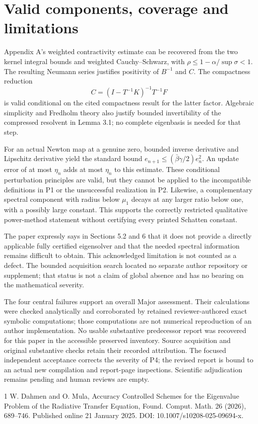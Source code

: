 \documentclass[10pt]{article}
\begin{document}
\section*{Valid components, coverage and limitations}
Appendix A’s weighted contractivity estimate can be recovered from the two kernel integral bounds and weighted Cauchy–Schwarz, with \(\rho\le1-\alpha/\sup\sigma<1\). The resulting Neumann series justifies positivity of \(B^{-1}\) and \(C\). The compactness reduction \[C=(I-T^{-1}K)^{-1}T^{-1}F\] is valid conditional on the cited compactness result for the latter factor. Algebraic simplicity and Fredholm theory also justify bounded invertibility of the compressed resolvent in Lemma 3.1; no complete eigenbasis is needed for that step.\par
For an actual Newton map at a genuine zero, bounded inverse derivative and Lipschitz derivative yield the standard bound \(e_{n+1}\le(\bar\beta\gamma/2)e_n^2\). An update error of at most \(\eta_n\) adds at most \(\eta_n\) to this estimate. These conditional perturbation principles are valid, but they cannot be applied to the incompatible definitions in P1 or the unsuccessful realization in P2. Likewise, a complementary spectral component with radius below \(\mu_1\) decays at any larger ratio below one, with a possibly large constant. This supports the correctly restricted qualitative power-method statement without certifying every printed Schatten constant.\par
The paper expressly says in Sections 5.2 and 6 that it does not provide a directly applicable fully certified eigensolver and that the needed spectral information remains difficult to obtain. This acknowledged limitation is not counted as a defect. The bounded acquisition search located no separate author repository or supplement; that status is not a claim of global absence and has no bearing on the mathematical severity.\par
The four central failures support an overall Major assessment. Their calculations were checked analytically and corroborated by retained reviewer-authored exact symbolic computations; those computations are not numerical reproduction of an author implementation. No usable substantive predecessor report was recovered for this paper in the accessible preserved inventory. Source acquisition and original substantive checks retain their recorded attribution. The focused independent acceptance corrects the severity of P4; the revised report is bound to an actual new compilation and report-page inspections. Scientific adjudication remains pending and human reviews are empty.\par
1 W. Dahmen and O. Mula, Accuracy Controlled Schemes for the Eigenvalue Problem of the Radiative Transfer Equation, Found. Comput. Math. 26 (2026), 689–746. Published online 21 January 2025. DOI: 10.1007/s10208-025-09694-x.\par
\end{document}
